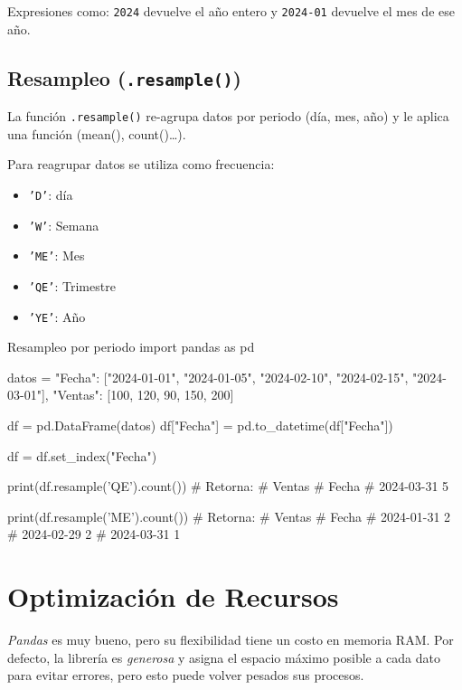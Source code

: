 \begin{nota}
    Expresiones como: \texttt{2024} devuelve el año entero y \texttt{2024-01} devuelve el mes de ese año.
\end{nota}


\subsection{Resampleo (\texttt{.resample()})}

La función \texttt{.resample()} re-agrupa datos por periodo (día, mes, año) y le aplica una función (mean(), count()\dots).

Para reagrupar datos se utiliza como frecuencia:
\begin{itemize}
    \item \texttt{'D'}: día
    \item \texttt{'W'}: Semana
    \item \texttt{'ME'}: Mes
    \item \texttt{'QE'}: Trimestre
    \item \texttt{'YE'}: Año
\end{itemize}

\begin{pycode}{Resampleo por periodo}
import pandas as pd

datos = {
    "Fecha": ["2024-01-01", "2024-01-05", "2024-02-10", "2024-02-15", "2024-03-01"],
    "Ventas": [100, 120, 90, 150, 200]
}

df = pd.DataFrame(datos)
df["Fecha"] = pd.to_datetime(df["Fecha"])

df = df.set_index("Fecha")

print(df.resample('QE').count()) # Retorna:
#             Ventas
# Fecha             
# 2024-03-31       5

print(df.resample('ME').count()) # Retorna:
#             Ventas
# Fecha             
# 2024-01-31       2
# 2024-02-29       2
# 2024-03-31       1
\end{pycode}






\section{Optimización de Recursos}

\textit{Pandas} es muy bueno, pero su flexibilidad tiene un costo en memoria RAM. Por defecto, la librería es \textit{generosa} y asigna el espacio máximo posible a cada dato para evitar errores, pero esto puede volver pesados sus procesos.

